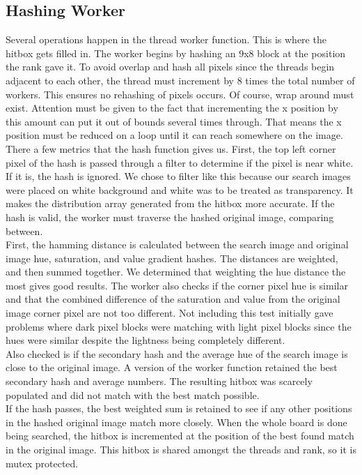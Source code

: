\documentclass[10pt, journal]{vgtc}                %
\begin{document}
\subsection{Hashing Worker}
\begin{flushleft}
Several operations happen in the thread worker function. This is where the hitbox gets filled in. The worker begins by hashing an 9x8 block at the position the rank gave it. To avoid overlap and hash all pixels since the threads begin adjacent to each other, the thread must increment by 8 times the total number of workers. This ensures no rehashing of pixels occurs. Of course, wrap around must exist. Attention must be given to the fact that incrementing the x position by this amount can put it out of bounds several times through. That means the x position must be reduced on a loop until it can reach somewhere on the image.\\\smallskip
There a few metrics that the hash function gives us. First, the top left corner pixel of the hash is passed through a filter to determine if the pixel is near white. If it is, the hash is ignored. We chose to filter like this because our search images were placed on white background and white was to be treated as transparency. It makes the distribution array generated from the hitbox more accurate. If the hash is valid, the worker must traverse the hashed original image, comparing between. \\\smallskip
First, the hamming distance is calculated between the search image and original image hue, saturation, and value gradient hashes. The distances are weighted, and then summed together. We determined that weighting the hue distance the most gives good results. The worker also checks if the corner pixel hue is similar and that the combined difference of the saturation and value from the original image corner pixel are not too different. Not including this test initially gave problems where dark pixel blocks were matching with light pixel blocks since the hues were similar despite the lightness being completely different.\\\smallskip
Also checked is if the secondary hash and the average hue of the search image is close to the original image. A version of the worker function retained the best secondary hash and average numbers. The resulting hitbox was scarcely populated and did not match with the best match possible. \\\smallskip
If the hash passes, the best weighted sum is retained to see if any other positions in the hashed original image match more closely. When the whole board is done being searched, the hitbox is incremented at the position of the best found match in the original image. This hitbox is shared amongst the threads and rank, so it is mutex protected. 
\end{flushleft}
\end{document}
